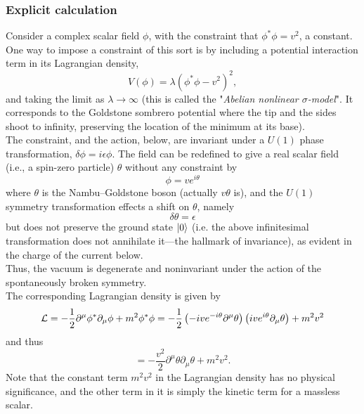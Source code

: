 \subsubsection{Explicit calculation}
Consider a complex scalar field $\phi$, with the constraint that $\phi^* \phi=v^2$, a constant. One way to impose a constraint of this sort is by including a potential interaction term in its Lagrangian density,
\begin{equation}
V(\phi) = \lambda (\phi^* \phi - v^2)^2,
\end{equation}
and taking the limit as $\lambda \rightarrow \infty$  (this is called the "\emph{Abelian nonlinear $\sigma$-model}". It corresponds to the Goldstone sombrero potential where the tip and the sides shoot to infinity, preserving the location of the minimum at its base).\\
The constraint, and the action, below, are invariant under a $U(1)$ phase transformation, $\delta \phi = i \epsilon \phi$. The field can be redefined to give a real scalar field (i.e., a spin-zero particle) $\theta$ without any constraint by
\begin{equation}
\phi = v e^{i \theta}
\end{equation}
where $\theta$ is the Nambu–Goldstone boson (actually $v\theta$ is), and the $U(1)$ symmetry transformation effects a shift on $\theta$, namely
\begin{equation}
\delta \theta = \epsilon
\end{equation}
but does not preserve the ground state $\ket{0}$ (i.e. the above infinitesimal transformation does not annihilate it—the hallmark of invariance), as evident in the charge of the current below.\\
Thus, the vacuum is degenerate and noninvariant under the action of the spontaneously broken symmetry.\\
The corresponding Lagrangian density is given by
\begin{equation}
\mathcal{L} =- \frac{1}{2} \partial^\mu \phi^* \partial_\mu \phi + m^2 \phi^* \phi = -\frac{1}{2} \left(-i ve^{-i \theta} \partial^\mu \theta\right)\left(ive^{i\theta} \partial_\mu \theta\right) + m^2 v^2
\end{equation}
and thus
\begin{equation}
= -\frac{v^2}{2} \partial^\mu \theta\partial_\mu\theta + m^2 v^2.
\end{equation}
Note that the constant term $m^2v^2$ in the Lagrangian density has no physical significance, and the other term in it is simply the kinetic term for a massless scalar.
